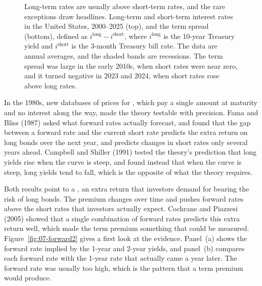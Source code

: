\begin{figure}[htbp]
{%
}
\caption{Long-term rates are usually above short-term rates, and the rare exceptions draw headlines. Long-term and short-term interest rates in the United States, 2000--2025 (top), and the term spread (bottom), defined as $i^{\mathrm{long}} - i^{\mathrm{short}}$, where $i^{\mathrm{long}}$ is the 10-year Treasury yield and $i^{\mathrm{short}}$ is the 3-month Treasury bill rate. The data are annual averages, and the shaded bands are recessions. The term spread was large in the early 2010s, when short rates were near zero, and it turned negative in 2023 and 2024, when short rates rose above long rates.}
\label{fig:07-long-short}
\end{figure}

In the 1980s, new databases of prices for , which pay a single amount at maturity and no interest along the way, made the theory testable with precision. Fama and Bliss (1987) asked what forward rates actually forecast, and found that the gap between a forward rate and the current short rate predicts the extra return on long bonds over the next year, and predicts changes in short rates only several years ahead. Campbell and Shiller (1991) tested the theory's prediction that long yields rise when the curve is steep, and found instead that when the curve is steep, long yields tend to fall, which is the opposite of what the theory requires. 

Both results point to a , an extra return that investors demand for bearing the risk of long bonds. The premium changes over time and pushes forward rates above the short rates that investors actually expect. Cochrane and Piazzesi (2005) showed that a single combination of forward rates predicts this extra return well, which made the term premium something that could be measured. Figure~\ref{fig:07-forward2} gives a first look at the evidence. Panel~(a) shows the forward rate implied by the 1-year and 2-year yields, and panel~(b) compares each forward rate with the 1-year rate that actually came a year later. The forward rate was usually too high, which is the pattern that a term premium would produce.


